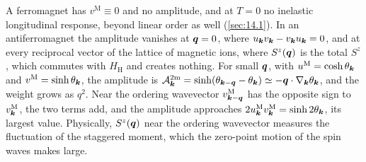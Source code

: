 A ferromagnet has $v^{\mathrm{M}} \equiv 0$ and no amplitude, and at $T = 0$ no inelastic longitudinal response, beyond linear order as well (\cref{sec:14.1}). In an antiferromagnet the amplitude vanishes at $\bm{q} = 0$, where $u_{\bm{k}}v_{\bm{k}} - v_{\bm{k}}u_{\bm{k}} = 0$, and at every reciprocal vector of the lattice of magnetic ions, where $S^z(\bm{q})$ is the total $S^z$, which commutes with $H_{\mathrm{H}}$ and creates nothing. For small $\bm{q}$, with $u^{\mathrm{M}} = \cosh\theta_{\bm{k}}$ and $v^{\mathrm{M}} = \sinh\theta_{\bm{k}}$, the amplitude is $\mathcal{A}^{\mathrm{2m}}_{\bm{k}} = \sinh(\theta_{\bm{k}-\bm{q}} - \theta_{\bm{k}}) \simeq -\bm{q}\cdot\nabla_{\bm{k}}\theta_{\bm{k}}$, and the weight grows as $q^2$. Near the ordering wavevector $v^{\mathrm{M}}_{\bm{k}-\bm{q}}$ has the opposite sign to $v^{\mathrm{M}}_{\bm{k}}$, the two terms add, and the amplitude approaches $2u^{\mathrm{M}}_{\bm{k}}v^{\mathrm{M}}_{\bm{k}} = \sinh2\theta_{\bm{k}}$, its largest value. Physically, $S^z(\bm{q})$ near the ordering wavevector measures the fluctuation of the staggered moment, which the zero-point motion of the spin waves makes large.


